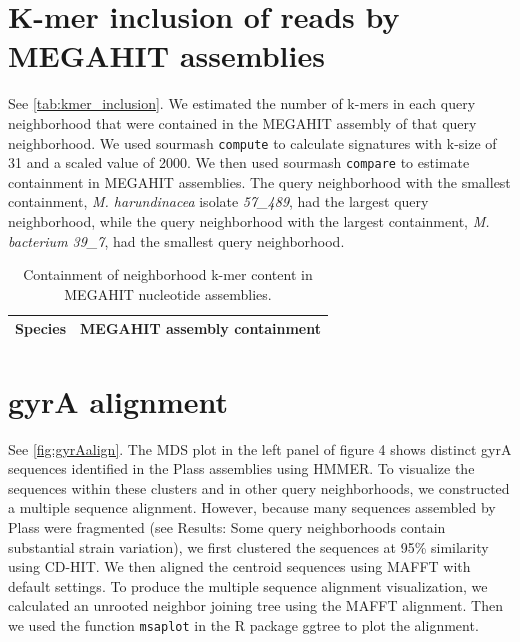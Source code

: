 \section{K-mer inclusion of reads by MEGAHIT assemblies}
\label{subsec:inclusion}

See \autoref{tab:kmer_inclusion}. We estimated the number of k-mers in each
query neighborhood that were contained in the MEGAHIT assembly of that query
neighborhood. We used sourmash {\tt compute} to calculate signatures with k-size of
31 and a scaled value of 2000. We then used sourmash {\tt compare} to estimate
containment in MEGAHIT assemblies. The query neighborhood with the smallest
containment, \emph{M. harundinacea} isolate \emph{57\_489}, had the largest query
neighborhood, while the query neighborhood with the largest containment,
\emph{M. bacterium 39\_7}, had the smallest query neighborhood.

\begin{table}
  \begin{tabular}{l c}
    \toprule
    Species & MEGAHIT assembly containment \\
    \midrule
    
%    
    \bottomrule
  \end{tabular}
  \caption{Containment of neighborhood k-mer content in MEGAHIT nucleotide assemblies.}
  \label{tab:kmer_inclusion}
\end{table}

\section{gyrA alignment}
\label{subsec:gyrAalign}

See \autoref{fig:gyrAalign}. The MDS plot in the left panel of figure 4 shows
distinct gyrA sequences identified in the Plass assemblies using HMMER. To visualize
the sequences within these clusters and in other query neighborhoods, we
constructed a multiple sequence alignment. However, because many
sequences assembled by Plass were fragmented (see Results: Some query neighborhoods
contain substantial strain variation), we first clustered the sequences at 95\%
similarity using CD-HIT. We then aligned the centroid sequences using MAFFT with
default settings. To produce the multiple sequence alignment visualization, we
calculated an unrooted neighbor joining tree using the MAFFT alignment. Then we used
the function {\tt msaplot} in the R package ggtree to plot the alignment.

